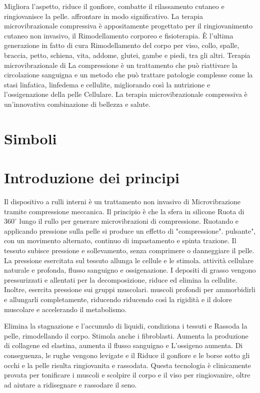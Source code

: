 \documentclass[a4paper]{article}
\begin{document}
Migliora l'aspetto, riduce il gonfiore, combatte il rilassamento cutaneo e ringiovanisce la pelle. affrontare in modo significativo. La terapia microvibrazionale compressiva è appositamente progettato per il ringiovanimento cutaneo non invasivo, il Rimodellamento corporeo e fisioterapia. È l'ultima generazione in fatto di cura Rimodellamento del corpo per viso, collo, spalle, braccia, petto, schiena, vita, addome, glutei, gambe e piedi, tra gli altri. Terapia microvibrazionale di La compressione è un trattamento che può riattivare la circolazione sanguigna e un metodo che può trattare patologie complesse come la stasi linfatica, linfedema e cellulite, migliorando così la nutrizione e l'ossigenazione della pelle Cellulare. La terapia microvibrazionale compressiva è un'innovativa combinazione di bellezza e salute.

\section{Simboli}


\section{Introduzione dei principi}
Il dispositivo a rulli interni è un trattamento non invasivo di Microvibrazione tramite compressione meccanica. Il principio è che la sfera in silicone Ruota di $360^{\circ}$ lungo il rullo per generare microvibrazioni di compressione. Ruotando e applicando pressione sulla pelle si produce un effetto di "compressione". pulsante", con un movimento alternato, continuo di impastamento e spinta trazione. Il tessuto subisce pressione e sollevamento, senza comprimere o danneggiare il pelle. La pressione esercitata sul tessuto allunga le cellule e le stimola. attività cellulare naturale e profonda, flusso sanguigno e ossigenazione. I depositi di grasso vengono pressurizzati e allentati per la decomposizione, riduce ed elimina la cellulite. Inoltre, esercita pressione sui gruppi muscolari. muscoli profondi per ammorbidirli e allungarli completamente, riducendo riducendo così la rigidità e il dolore muscolare e accelerando il metabolismo.

Elimina la stagnazione e l'accumulo di liquidi, condiziona i tessuti e Rassoda la pelle, rimodellando il corpo. Stimola anche i fibroblasti. Aumenta la produzione di collagene ed elastina, aumenta il flusso sanguigno e L'ossigeno aumenta. Di conseguenza, le rughe vengono levigate e il Riduce il gonfiore e le borse sotto gli occhi e la pelle risulta ringiovanita e rassodata. Questa tecnologia è clinicamente provata per tonificare i muscoli e scolpire il corpo e il viso per ringiovanire, oltre ad aiutare a ridisegnare e rassodare il seno.
\end{document}
